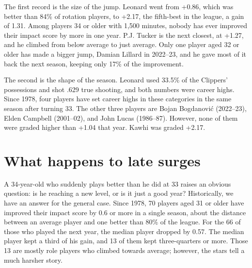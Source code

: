 \documentclass[11pt]{article}
\begin{document}
The first record is the size of the jump. Leonard went from +0.86, which was better than 84\% of
rotation players, to +2.17, the fifth-best in the league, a gain of 1.31. Among players 34 or
older with 1,500 minutes, nobody has ever improved their impact score by more in one year. P.J.
Tucker is the next closest, at +1.27, and he climbed from below average to just average. Only one
player aged 32 or older has made a bigger jump, Damian Lillard in 2022--23, and he gave most of it
back the next season, keeping only 17\% of the improvement.

The second is the shape of the season. Leonard used 33.5\% of the Clippers' possessions and shot
.629 true shooting, and both numbers were career
highs. Since 1978, four
players have set career highs in these categories in the same season after turning 33. The other
three players are Bojan Bogdanović (2022--23), Elden Campbell (2001--02), and John Lucas
(1986--87). However, none of them were graded higher than +1.04 that year. Kawhi was graded
+2.17.

\section*{What happens to late surges}

A 34-year-old who suddenly plays better than he did at 33 raises an obvious question: is he
reaching a new level, or is it just a good year? Historically, we have an answer for the general
case. Since 1978, 70 players aged 31 or older have improved their impact score by 0.6 or more in a
single season, about the distance between an average player and one better than 80\% of the
league. For the 66 of those who played the next year, the median player dropped by 0.57. The
median player kept a third of his gain, and 13 of them kept three-quarters or more. Those 13 are
mostly role players who climbed towards average; however, the stars tell a much harsher story.
\end{document}
